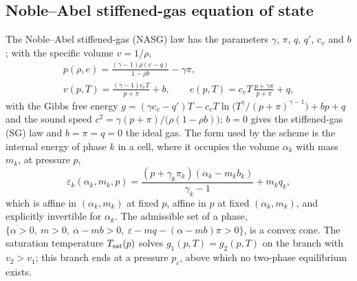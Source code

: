 \subsection{Noble--Abel stiffened-gas equation of state}
\label{sec:nasg}
The Noble--Abel stiffened-gas (NASG) law \cite{LeMetayerSaurel2016} has the parameters $\gamma$, $\pi$, $q$, $q'$, $c_v$ and $b$; with the
specific volume $v=1/\rho$,
\begin{equation}
\begin{gathered}
p(\rho,e)=\frac{(\gamma-1)\rho(e-q)}{1-\rho b}-\gamma\pi,\\
v(p,T)=\frac{(\gamma-1)c_vT}{p+\pi}+b,\qquad e(p,T)=c_vT\,\frac{p+\gamma\pi}{p+\pi}+q,
\end{gathered}
\label{eq:nasg}
\end{equation}
with the Gibbs free energy $g=(\gamma c_v-q')T-c_vT\ln\big(T^\gamma/(p+\pi)^{\gamma-1}\big)+bp+q$ and the sound speed
$c^2=\gamma(p+\pi)/\big(\rho(1-\rho b)\big)$; $b=0$ gives the stiffened-gas (SG) law and $b=\pi=q=0$ the ideal gas. The form used by the
scheme is the internal energy of phase $k$ in a cell, where it occupies the volume $\alpha_k$ with mass $m_k$, at pressure $p$,
\begin{equation}
\varepsilon_k(\alpha_k,m_k,p)=\frac{(p+\gamma_k\pi_k)(\alpha_k-m_kb_k)}{\gamma_k-1}+m_kq_k ,
\label{eq:eps_nasg}
\end{equation}
which is affine in $(\alpha_k,m_k)$ at fixed $p$, affine in $p$ at fixed $(\alpha_k,m_k)$, and explicitly invertible for $\alpha_k$. The
admissible set of a phase, $\{\alpha>0,\ m>0,\ \alpha-mb>0,\ \varepsilon-mq-(\alpha-mb)\pi>0\}$, is a convex cone. The saturation
temperature $T_{\rm sat}(p)$ solves $g_1(p,T)=g_2(p,T)$ on the branch with $v_2>v_1$; this branch ends at a pressure $p_c$,
above which no two-phase equilibrium exists.

